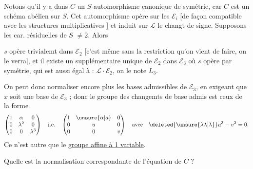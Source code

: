 
Notons qu'il y a dans $C$ un $S$-automorphisme canonique de symétrie, car $C$ est un schéma abélien sur $S$. Cet automorphisme  opère sur les $\mathcal E_i$ [de façon compatible avec les structures multiplicatives ] et induit sur $\mathcal L$ le changt de signe.   Supposons les car. résiduelles de $S$ $\ne2$. Alors



$s$ opère trivialemt dans $\mathcal E_2$ [c'est même sans la restriction qu'on vient de faire, on le verra], et il existe un supplémentaire unique  de $\mathcal E_2$ dans $\mathcal E_3$ où $s$ opère par symétrie,  qui est aussi égal à : $\mathcal L\cdot\mathcal E_2$, on le note $L_3$.

 On peut donc normaliser encore plus les bases admissibles de $\mathcal E_3$, en exigeant que $x$ soit une base de $\mathcal E_3$ ; donc le groupe des changemts de base admis est ceux de la forme
\[
\begin{pmatrix}1&\alpha&0\\0&\lambda^2&0\\0&0&\lambda^3\end{pmatrix}
\quad\text{i.e.}\quad
\begin{pmatrix}1&\unsure{\alpha|a}&0\\0&u&0\\0&0&v\end{pmatrix}
\quad\text{avec}\quad\deleted{\unsure{\lambda\lambda|\lambda}}u^3-v^2=0.
\]
Ce n'est autre que le \uline{groupe affine à 1 variable}.

Quelle est la normalisation correspondante de l'équation de $C$ ?
